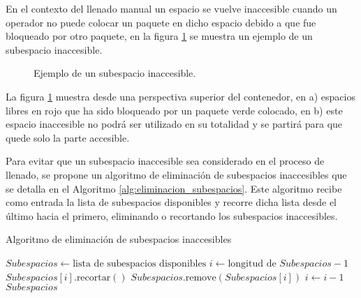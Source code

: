 En el contexto del llenado manual un espacio se vuelve inaccesible cuando un operador no puede colocar un paquete en dicho espacio debido a que fue bloqueado por otro paquete, en la figura \ref{fig:subespacio_inaccesible} se muestra un ejemplo de un subespacio inaccesible.

\begin{figure}[H]
    \centering
    
    \caption{Ejemplo de un subespacio inaccesible.}
    \label{fig:subespacio_inaccesible}
\end{figure}

La figura \ref{fig:subespacio_inaccesible} muestra desde una perspectiva superior del contenedor, en a) espacios libres en rojo que ha sido bloqueado por un paquete verde colocado, en b) este espacio inaccesible no podrá ser utilizado en su totalidad y se partirá para que quede solo la parte accesible.

Para evitar que un subespacio inaccesible sea considerado en el proceso de llenado, se propone un algoritmo de eliminación de subespacios inaccesibles que se detalla en el Algoritmo \ref{alg:eliminacion_subespacios}. Este algoritmo recibe como entrada la lista de subespacios disponibles y recorre dicha lista desde el último hacia el primero, eliminando o recortando los subespacios inaccesibles.

\begin{algorithm}[H]
\caption{Algoritmo de eliminación de subespacios inaccesibles}
\label{alg:eliminacion_subespacios}
\begin{algorithmic}[1]
    \State $Subespacios \gets \text{lista de subespacios disponibles}$
    \State $i \gets \text{longitud de } Subespacios - 1$
            \State $Subespacios[i].\text{recortar}()$
            \State $Subespacios.\text{remove}(Subespacios[i])$
        \EndIf
        \State $i \gets i - 1$
    \EndWhile
    \State \Return $Subespacios$
\end{algorithmic}
\end{algorithm}

